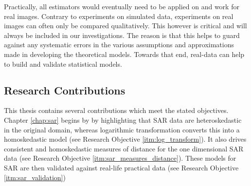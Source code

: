 Practically, all estimators would eventually need to be applied on and work for real images.
Contrary to experiments on simulated data, experiments on real images can often only be compared qualitatively.
This however is critical and will always be included in our investigations.
The reason is that this helps to guard against any systematic errors in the various assumptions and approximations made in developing the theoretical models.
Towards that end, real-data can help to build and validate statistical models.

\subsection{Research Contributions}


This thesis contains several contributions which meet the stated objectives.
                Chapter \ref{chap:sar} begins by by highlighting that SAR
                data are heteroskedastic in the original domain, whereas
                logarithmic transformation converts this into a
                homoskedastic model (see Research Objective \ref{itm:log_transform}). 
It
                also drives consistent and homoskedastic measures of
                distance for the one dimensional SAR data (see Research Objective \ref{itm:sar_measures_distance}).
These
                models for SAR are then validated against real-life
                practical data (see Research Objective \ref{itm:sar_validation})


